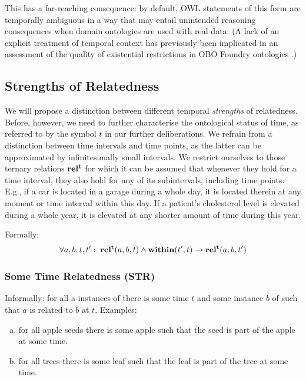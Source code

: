 This has a far-reaching consequence: by default, OWL statements of this form are temporally ambiguous in a way that may entail unintended reasoning consequences when domain ontologies are used with real data. (A lack of an explicit treatment of temporal context has previously been implicated in an assessment of the quality of existential restrictions in OBO Foundry ontologies \cite{boeker2011}.)

\subsection*{Strengths of Relatedness}

We will propose a distinction between different temporal \emph{strengths} of relatedness. Before, however, we need to further characterise the ontological status of time, as referred to by the symbol $t$
in our further deliberations. We refrain from a distinction between time intervals and time points, as the latter can be approximated by infinitesimally small intervals.
We restrict ourselves to those ternary relations $\mathrm{\mathbf{rel^t}}$ for which it can be assumed that whenever they hold for a time interval, 
they also hold for any of its subintervals, including time points. E.g., if a car is located in a garage during a whole day, it is located therein at any moment or time interval within this day. If a patient's cholesterol level is elevated during a whole year, it is elevated at any shorter amount of time during this year. 

Formally:
\begin{equation}
\begin{split}
\forall a, b, t, t^\prime:\; \mathrm{\mathbf{rel^t}}(a, b, t) \wedge \mathrm{\mathbf{within}}(t^\prime,t) \rightarrow
\mathrm{\mathbf{rel^t}}(a,b,t^\prime)
\end{split}
\label{eq:temporarily:temp}
\end{equation}

\subsubsection*{Some Time Relatedness (STR)}

Informally: for all a instances of  there is some time $t$ and some instance $b$ of
 such that $a$ is related to $b$ at $t$. Examples:
\begin{enumerate}[(a)]
\item for all apple seeds there is
some apple such that the seed is part of the apple at some time.
\item for all
trees there is some leaf such that the leaf is part of the tree at some time.
\end{enumerate}

